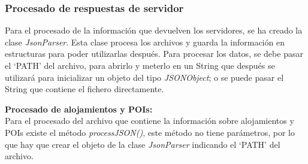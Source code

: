 \subsubsection{Procesado de respuestas de servidor}
Para el procesado de la información que devuelven los servidores, se ha creado la clase \textit{JsonParser}. Esta clase procesa los archivos y guarda la información en estructuras para poder utilizarlas después. Para procesar los datos, se debe pasar el \enquote*{PATH} del archivo, para abrirlo y meterlo en un String que después se utilizará para inicializar un objeto del tipo \textit{JSONObject}; o se puede pasar el String que contiene el fichero directamente.\newline

\vspace{0.06in}
\textbf{Procesado de alojamientos y POIs:}\\
Para el procesado del archivo que contiene la información sobre alojamientos y POIs existe el método \textit{processJSON()}, este método no tiene parámetros, por lo que hay que crear el objeto de la clase \textit{JsonParser} indicando el \enquote*{PATH} del archivo.\newline

